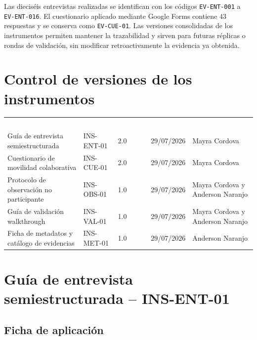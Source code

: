 \documentclass[10pt,a4paper]{article}
\begin{document}
Las dieciséis entrevistas realizadas se identifican con los códigos \texttt{EV-ENT-001} a \texttt{EV-ENT-016}. El cuestionario aplicado mediante Google Forms contiene 43 respuestas y se conserva como \texttt{EV-CUE-01}. Las versiones consolidadas de los instrumentos permiten mantener la trazabilidad y sirven para futuras réplicas o rondas de validación, sin modificar retroactivamente la evidencia ya obtenida.

\section{Control de versiones de los instrumentos}

\noindent\begin{tabularx}{\textwidth}{L{4.05cm} C{2.25cm} C{1.45cm} C{2.55cm} J}
\textcolor{white}{\textbf{Instrumento}} &
\textcolor{white}{\textbf{Código}} &
\textcolor{white}{\textbf{Versión}} &
\textcolor{white}{\textbf{Fecha}} &
\textcolor{white}{\textbf{Responsable}}\\
Guía de entrevista semiestructurada & INS-ENT-01 & 2.0 & 29/07/2026 & Mayra Cordova\\
Cuestionario de movilidad colaborativa & INS-CUE-01 & 2.0 & 29/07/2026 & Mayra Cordova\\
Protocolo de observación no participante & INS-OBS-01 & 1.0 & 29/07/2026 & Mayra Cordova y Anderson Naranjo\\
Guía de validación walkthrough & INS-VAL-01 & 1.0 & 29/07/2026 & Mayra Cordova y Anderson Naranjo\\
Ficha de metadatos y catálogo de evidencias & INS-MET-01 & 1.0 & 29/07/2026 & Anderson Naranjo\\
\end{tabularx}

\section{Guía de entrevista semiestructurada -- INS-ENT-01}

\subsection{Ficha de aplicación}
\end{document}
